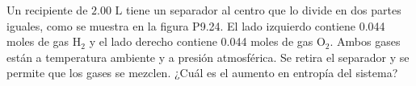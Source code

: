 \item Un recipiente de $2.00\text{ L}$ tiene un separador al centro que lo divide en dos partes iguales, como se muestra en la figura P9.24. El lado izquierdo contiene 0.044 moles de gas $\text{H}_2$ y el lado derecho contiene 0.044 moles de gas $\text{O}_2$. Ambos gases están a temperatura ambiente y a presión atmosférica. Se retira el separador y se permite que los gases se mezclen. ¿Cuál es el aumento en entropía del sistema?
